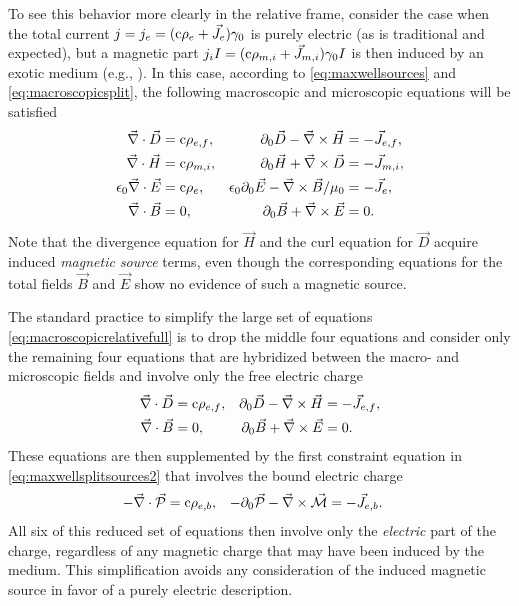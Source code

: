 \documentclass[1p,sort&compress]{elsarticle}
\numberwithin{equation}{section}
\newcommand{\rv}[1]{\vec{#1}}
\newcommand{\cc}{{\rm c}}
\begin{document}
To see this behavior more clearly in the relative frame, consider the case when the total current $j = j_e = (\cc\rho_e + \rv{J}_e)\gamma_0$ is purely electric (as is traditional and expected), but a magnetic part $j_iI = (\cc\rho_{m,i} + \rv{J}_{m,i})\gamma_0 I$ is then induced by an exotic medium (e.g., \cite{Castelnovo2008,Giblin2011,Braun2014,Paulsen2014,Ray2014}).  In this case, according to \eqref{eq:maxwellsources} and \eqref{eq:macroscopicsplit}, the following macroscopic and microscopic equations will be satisfied 
\begin{align}\label{eq:macroscopicrelativefull}
  \rv{\nabla}\cdot\rv{D} &= \cc\rho_{e,f}, & \partial_0 \rv{D} - \rv{\nabla}\times\rv{H} &= - \rv{J}_{e,f}, \\
  \rv{\nabla}\cdot\rv{H} &= \cc\rho_{m,i}, & \partial_0 \rv{H} + \rv{\nabla}\times\rv{D} &= - \rv{J}_{m,i}, \nonumber \\
  \epsilon_0 \rv{\nabla}\cdot\rv{E} &= \cc\rho_e, & \epsilon_0\partial_0 \rv{E} - \rv{\nabla}\times\rv{B}/\mu_0 &= - \rv{J}_e, \nonumber \\
  \rv{\nabla}\cdot\rv{B} &= 0, & \partial_0 \rv{B} + \rv{\nabla}\times\rv{E} &= 0. \nonumber
\end{align}
Note that the divergence equation for $\rv{H}$ and the curl equation for $\rv{D}$ acquire induced \emph{magnetic source} terms, even though the corresponding equations for the total fields $\rv{B}$ and $\rv{E}$ show no evidence of such a magnetic source.  

The standard practice \cite{Jackson1999,Landau1984} to simplify the large set of equations \eqref{eq:macroscopicrelativefull} is to drop the middle four equations and consider only the remaining four equations that are hybridized between the macro- and microscopic fields and involve only the free electric charge
\begin{align}\label{eq:macroscopicrelative}
  \rv{\nabla}\cdot\rv{D} &= \cc\rho_{e,f}, & \partial_0 \rv{D} - \rv{\nabla}\times\rv{H} &= - \rv{J}_{e,f}, \\
  \rv{\nabla}\cdot\rv{B} &= 0, & \partial_0 \rv{B} + \rv{\nabla}\times\rv{E} &= 0. \nonumber
\end{align}
These equations are then supplemented by the first constraint equation in \eqref{eq:maxwellsplitsources2} that involves the bound electric charge
\begin{align}\label{eq:macroscopicrelative2}
  -\rv{\nabla}\cdot\rv{\mathcal{P}} &= \cc\rho_{e,b}, & -\partial_0 \rv{\mathcal{P}} - \rv{\nabla}\times\rv{\mathcal{M}} &= - \rv{J}_{e,b}.
\end{align}
All six of this reduced set of equations then involve only the \emph{electric} part of the charge, regardless of any magnetic charge that may have been induced by the medium.  This simplification avoids any consideration of the induced magnetic source in favor of a purely electric description.  
\end{document}
